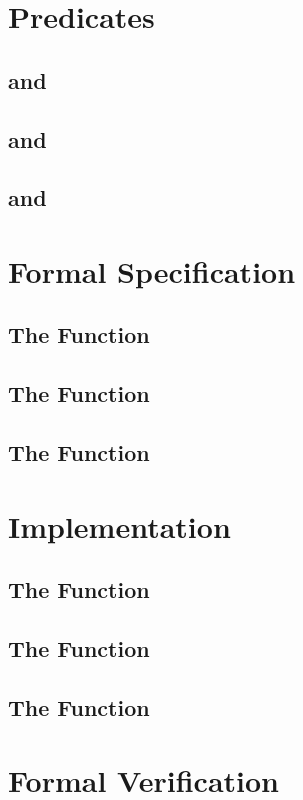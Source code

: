 \section{Predicates}
\subsection{ and }
\subsection{ and }
\subsection{ and }
\subsection{}

\section{Formal Specification}
\subsection{The Function \bitstreamread}
\subsection{The Function }
\subsection{The Function }

\section{Implementation}
\subsection{The Function \bitstreamread}
\subsection{The Function }
\subsection{The Function }

\section{Formal Verification}
\subsection{}
\subsection{}


